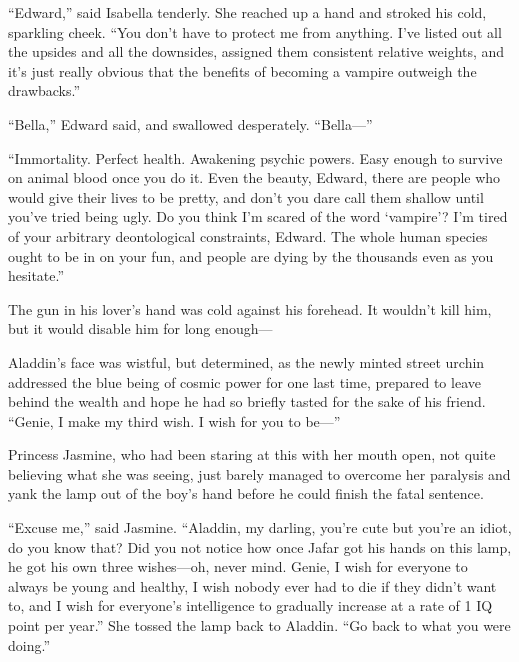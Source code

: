 
“Edward,” said Isabella tenderly. She reached up a hand and stroked his cold, sparkling cheek. “You don’t have to protect me from anything. I’ve listed out all the upsides and all the downsides, assigned them consistent relative weights, and it’s just really obvious that the benefits of becoming a vampire outweigh the drawbacks.”

“Bella,” Edward said, and swallowed desperately. “Bella—”

“Immortality. Perfect health. Awakening psychic powers. Easy enough to survive on animal blood once you do it. Even the beauty, Edward, there are people who would give their lives to be pretty, and don’t you dare call them shallow until you’ve tried being ugly. Do you think I’m scared of the word ‘vampire’? I’m tired of your arbitrary deontological constraints, Edward. The whole human species ought to be in on your fun, and people are dying by the thousands even as you hesitate.”

The gun in his lover’s hand was cold against his forehead. It wouldn’t kill him, but it would disable him for long enough—


Aladdin’s face was wistful, but determined, as the newly minted street urchin addressed the blue being of cosmic power for one last time, prepared to leave behind the wealth and hope he had so briefly tasted for the sake of his friend. “Genie, I make my third wish. I wish for you to be—”

Princess Jasmine, who had been staring at this with her mouth open, not quite believing what she was seeing, just barely managed to overcome her paralysis and yank the lamp out of the boy’s hand before he could finish the fatal sentence.

“Excuse me,” said Jasmine. “Aladdin, my darling, you’re cute but you’re an idiot, do you know that? Did you not notice how once Jafar got his hands on this lamp, he got his own three wishes—oh, never mind. Genie, I wish for everyone to always be young and healthy, I wish nobody ever had to die if they didn’t want to, and I wish for everyone’s intelligence to gradually increase at a rate of 1 IQ point per year.” She tossed the lamp back to Aladdin. “Go back to what you were doing.”

